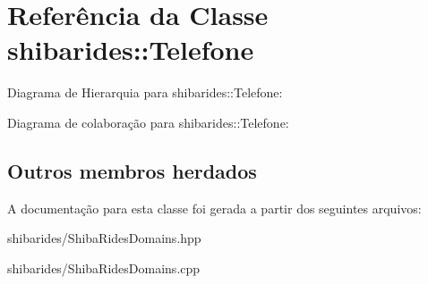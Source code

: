 \hypertarget{classshibarides_1_1Telefone}{}\section{Referência da Classe shibarides\+:\+:Telefone}
\label{classshibarides_1_1Telefone}


Diagrama de Hierarquia para shibarides\+:\+:Telefone\+:


Diagrama de colaboração para shibarides\+:\+:Telefone\+:
\subsection*{Outros membros herdados}


A documentação para esta classe foi gerada a partir dos seguintes arquivos\+:\begin{DoxyCompactItemize}
\item 
shibarides/Shiba\+Rides\+Domains.\+hpp\item 
shibarides/Shiba\+Rides\+Domains.\+cpp\end{DoxyCompactItemize}
